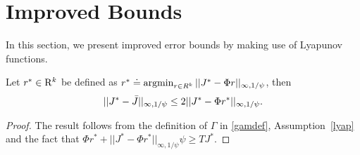 \section{Improved Bounds}\label{sec:improv}
In this section, we present improved error bounds by making use of Lyapunov functions. 
\begin{lemma}\label{bestbndmn}
Let $r^*\in \mathrm{R}^k$ be defined as $r^*\doteq\operatorname{argmin}_{r\in R^k}||J^*-\Phi r||_{\infty,1/\psi}$, then 
\begin{align}
||J^*-\bar{J}||_{\infty,1/\psi}\leq 2||J^*-\Phi r^*||_{\infty,1/\psi}.
\end{align}
\end{lemma}
\begin{proof}
The result follows from the definition of $\Gamma$ in \eqref{gamdef}, Assumption~\ref{lyap} and the fact that $\Phi r^*+||J^*-\Phi r^*||_{\infty,1/\psi} \psi\geq TJ^*$.
\end{proof}

